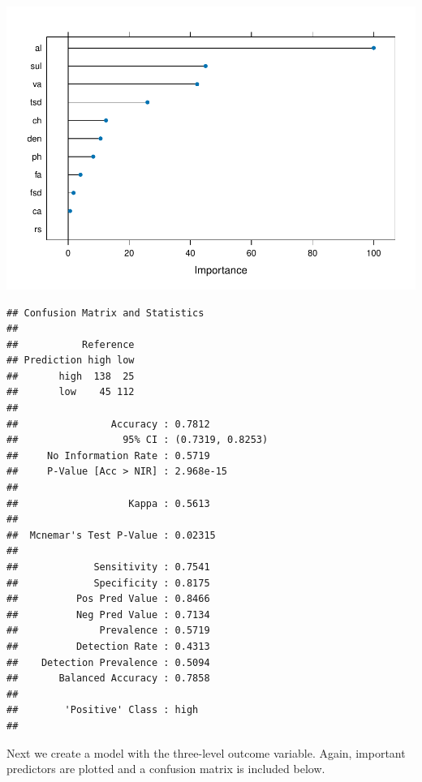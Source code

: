 \documentclass[
]{book}
\newenvironment{Shaded}{\begin{snugshade}}{\end{snugshade}}
\newcommand{\FunctionTok}[1]{\textcolor[rgb]{0.13,0.29,0.53}{\textbf{#1}}}
\newcommand{\NormalTok}[1]{#1}
\newcommand{\SpecialCharTok}[1]{\textcolor[rgb]{0.81,0.36,0.00}{\textbf{#1}}}
\begin{document}
\includegraphics{bookdown-demo_files/figure-latex/rf-1.pdf}

\begin{Shaded}
\end{Shaded}

\begin{verbatim}
## Confusion Matrix and Statistics
## 
##           Reference
## Prediction high low
##       high  138  25
##       low    45 112
##                                           
##                Accuracy : 0.7812          
##                  95% CI : (0.7319, 0.8253)
##     No Information Rate : 0.5719          
##     P-Value [Acc > NIR] : 2.968e-15       
##                                           
##                   Kappa : 0.5613          
##                                           
##  Mcnemar's Test P-Value : 0.02315         
##                                           
##             Sensitivity : 0.7541          
##             Specificity : 0.8175          
##          Pos Pred Value : 0.8466          
##          Neg Pred Value : 0.7134          
##              Prevalence : 0.5719          
##          Detection Rate : 0.4313          
##    Detection Prevalence : 0.5094          
##       Balanced Accuracy : 0.7858          
##                                           
##        'Positive' Class : high            
## 
\end{verbatim}

Next we create a model with the three-level outcome variable. Again, important predictors are plotted and a confusion matrix is included below.
\end{document}
